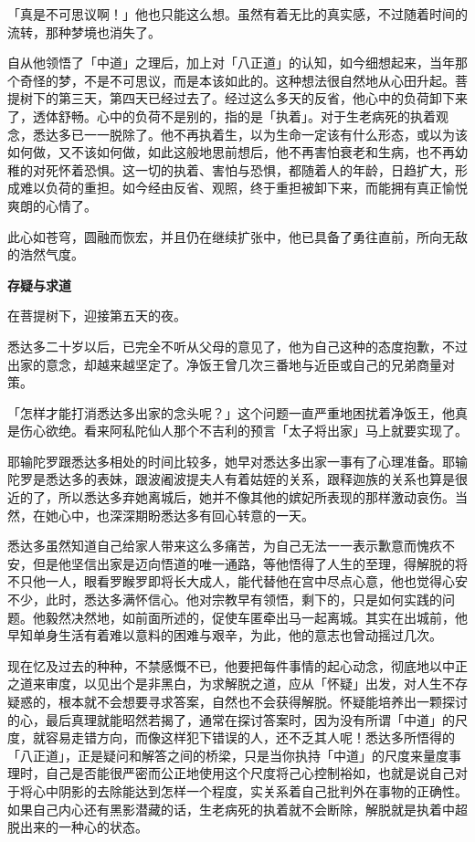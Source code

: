 \documentclass[twoside,openany]{book}
\newcommand{\mt}[1]{\textbullet \textbf{#1}}
\begin{document}
「真是不可思议啊！」他也只能这么想。虽然有着无比的真实感，不过随着时间的流转，那种梦境也消失了。

自从他领悟了「中道」之理后，加上对「八正道」的认知，如今细想起来，当年那个奇怪的梦，不是不可思议，而是本该如此的。这种想法很自然地从心田升起。菩提树下的第三天，第四天已经过去了。经过这么多天的反省，他心中的负荷卸下来了，透体舒畅。心中的负荷不是别的，指的是「执着」。对于生老病死的执着观念，悉达多已一一脱除了。他不再执着生，以为生命一定该有什么形态，或以为该如何做，又不该如何做，如此这般地思前想后，他不再害怕衰老和生病，也不再幼稚的对死怀着恐惧。这一切的执着、害怕与恐惧，都随着人的年龄，日趋扩大，形成难以负荷的重担。如今经由反省、观照，终于重担被卸下来，而能拥有真正愉悦爽朗的心情了。

此心如苍穹，圆融而恢宏，并且仍在继续扩张中，他已具备了勇往直前，所向无敌的浩然气度。

\mt{存疑与求道}

在菩提树下，迎接第五天的夜。

悉达多二十岁以后，已完全不听从父母的意见了，他为自己这种的态度抱歉，不过出家的意念，却越来越坚定了。净饭王曾几次三番地与近臣或自己的兄弟商量对策。

「怎样才能打消悉达多出家的念头呢？」这个问题一直严重地困扰着净饭王，他真是伤心欲绝。看来阿私陀仙人那个不吉利的预言「太子将出家」马上就要实现了。

耶输陀罗跟悉达多相处的时间比较多，她早对悉达多出家一事有了心理准备。耶输陀罗是悉达多的表妹，跟波阇波提夫人有着姑姪的关系，跟释迦族的关系也算是很近的了，所以悉达多弃她离城后，她并不像其他的嫔妃所表现的那样激动哀伤。当然，在她心中，也深深期盼悉达多有回心转意的一天。

悉达多虽然知道自己给家人带来这么多痛苦，为自己无法一一表示歉意而愧疚不安，但是他坚信出家是迈向悟道的唯一通路，等他悟得了人生的至理，得解脱的将不只他一人，眼看罗睺罗即将长大成人，能代替他在宫中尽点心意，他也觉得心安不少，此时，悉达多满怀信心。他对宗教早有领悟，剩下的，只是如何实践的问题。他毅然决然地，如前面所述的，促使车匿牵出马一起离城。其实在出城前，他早知单身生活有着难以意料的困难与艰辛，为此，他的意志也曾动摇过几次。

现在忆及过去的种种，不禁感慨不已，他要把每件事情的起心动念，彻底地以中正之道来审度，以见出个是非黑白，为求解脱之道，应从「怀疑」出发，对人生不存疑惑的，根本就不会想要寻求答案，自然也不会获得解脱。怀疑能培养出一颗探讨的心，最后真理就能昭然若揭了，通常在探讨答案时，因为没有所谓「中道」的尺度，就容易走错方向，而像这样犯下错误的人，还不乏其人呢！悉达多所悟得的「八正道」，正是疑问和解答之间的桥梁，只是当你执持「中道」的尺度来量度事理时，自己是否能很严密而公正地使用这个尺度将己心控制裕如，也就是说自己对于将心中阴影的去除能达到怎样一个程度，实关系着自己批判外在事物的正确性。如果自己内心还有黑影潜藏的话，生老病死的执着就不会断除，解脱就是执着中超脱出来的一种心的状态。
\end{document}
